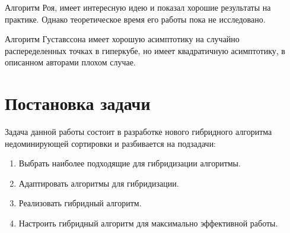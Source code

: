 Алгоритм Роя, имеет интересную идею и показал хорошие результаты на практике. Однако теоретическое время его работы пока не исследовано. 

Алгоритм Густавссона имеет хорошую асимптотику на случайно распеределенных точках в гиперкубе, но имеет квадратичную асимптотику, в описанном авторами плохом случае. 

\section{Постановка задачи}

Задача данной работы состоит в разработке нового гибридного алгоритма недоминирующей сортировки и разбивается на подзадачи:
\begin{enumerate}
	\item Выбрать наиболее подходящие для гибридизации алгоритмы.
	\item Адаптировать алгоритмы для гибридизации.
	\item Реализовать гибридный алгоритм.
	\item Настроить гибридный алгоритм для максимально эффективной работы.
\end{enumerate}
